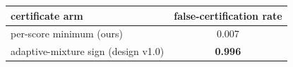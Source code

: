 \begin{tabular}{lc}
\toprule
certificate arm & false-certification rate\\
\midrule
per-score minimum (ours) & 0.007\\
adaptive-mixture sign (design v1.0) & \textbf{0.996}\\
\bottomrule
\end{tabular}
